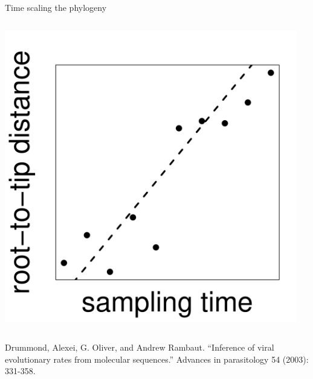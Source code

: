 \documentclass{beamer}
\begin{document}
\begin{frame}{Time scaling the phylogeny}
\begin{columns}
\begin{column}{0.5\textwidth}
            \includegraphics[width=\textwidth]{rtt}
        \end{column}
        \begin{column}{0.5\textwidth}
        \end{column}
    \end{columns}

    \tiny
    Drummond, Alexei, G. Oliver, and Andrew Rambaut. ``Inference of viral
    evolutionary rates from molecular sequences.'' Advances in parasitology 54
    (2003): 331-358.\par
\end{frame}
\end{document}
